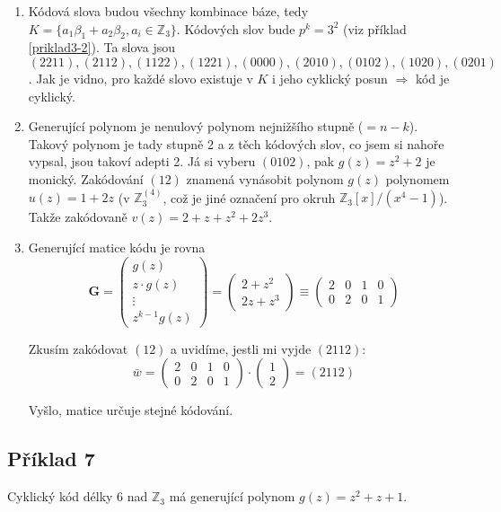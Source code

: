 \documentclass{article}
\begin{document}
\begin{enumerate}
	\item Kódová slova budou všechny kombinace báze, tedy $K = \{a_1\beta_1 + a_2\beta_2, a_i \in \mathbb{Z}_3 \}$. Kódových slov bude $p^k = 3^2$ (viz příklad \ref{priklad3-2}). Ta slova jsou $(2211),(2112),(1122),(1221),(0000),(2010),(0102),(1020),(0201)$. Jak je vidno, pro každé slovo existuje v $K$ i jeho cyklický posun $\Rightarrow$ kód je cyklický. 
	\item Generující polynom je nenulový polynom nejnižšího stupně ($=n-k$). Takový polynom je tady stupně 2 a z těch kódových slov, co jsem si nahoře vypsal, jsou takoví adepti 2. Já si vyberu $(0102)$, pak $g(z) = z^2 + 2$ je monický. Zakódování $(12)$ znamená vynásobit polynom $g(z)$ polynomem $u(z) = 1 + 2z$ (v $\mathbb{Z}_3^{(4)}$, což je jiné označení pro okruh $\mathbb{Z}_3[x]/(x^4 - 1)$). Takže zakódovaně $v(z) = 2 + z + z^2 + 2z^3$.   
	\item Generující matice kódu je rovna
	\[ \mathbf{G} = \begin{pmatrix}
  g(z) \\
  z\cdot g(z) \\
  \vdots \\
  z^{k-1}g(z)
	\end{pmatrix} = 
	\begin{pmatrix}
  2 + z^2\\
  2z + z^3 
	\end{pmatrix} \equiv
	\begin{pmatrix}
  2 & 0 & 1 & 0\\
  0 & 2 & 0 & 1 
	\end{pmatrix}
\]

Zkusím zakódovat $(12)$ a uvidíme, jestli mi vyjde $(2112)$:
\[ \bar{w} = \begin{pmatrix}
  2 & 0 & 1 & 0\\
  0 & 2 & 0 & 1 
	\end{pmatrix}\cdot 
	\begin{pmatrix}
  1\\
  2 
	\end{pmatrix} = (2112)
	\]
	
	Vyšlo, matice určuje stejné kódování.	
\end{enumerate}

\subsection{Příklad 7}
Cyklický kód délky 6 nad $\mathbb{Z}_3$ má generující polynom $g(z) = z^2 + z + 1$.
\end{document}
